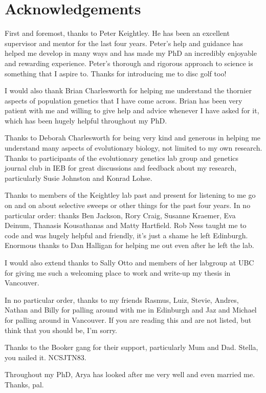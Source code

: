 \chapter{Acknowledgements}

First and foremost, thanks to Peter Keightley. He has been an excellent supervisor and mentor for the last four years. Peter's help and guidance has helped me develop in many ways and has made my PhD an incredibly enjoyable and rewarding experience. Peter's thorough and rigorous approach to science is something that I aspire to. Thanks for introducing me to disc golf too!

I would also thank Brian Charlesworth for helping me understand the thornier aspects of population genetics that I have come across. Brian has been very patient with me and willing to give help and advice whenever I have asked for it, which has been hugely helpful throughout my PhD.

Thanks to Deborah Charlesworth for being very kind and generous in helping me understand many aspects of evolutionary biology, not limited to my own research. Thanks to participants of the evolutionary genetics lab group and genetics journal club in IEB for great discussions and feedback about my research, particularly Susie Johnston and Konrad Lohse.

Thanks to members of the Keightley lab past and present for listening to me go on and on about selective sweeps or other things for the past four years. In no particular order: thanks Ben Jackson, Rory Craig, Susanne Kraemer, Eva Deinum, Thanasis Kousathanas and Matty Hartfield. Rob Ness taught me to code and was hugely helpful and friendly, it's just a shame he left Edinburgh. Enormous thanks to Dan Halligan for helping me out even after he left the lab.

I would also extend thanks to Sally Otto and members of her labgroup at UBC for giving me such a welcoming place to work and write-up my thesis in Vancouver.

In no particular order, thanks to my friends Rasmus, Luiz, Stevie, Andres, Nathan and Billy for palling around with me in Edinburgh and Jaz and Michael for palling around in Vancouver. If you are reading this and are not listed, but think that you should be, I'm sorry.

Thanks to the Booker gang for their support, particularly Mum and Dad. Stella, you nailed it. NCSJTN83.

Throughout my PhD, Arya has looked after me very well and even married me. Thanks, pal.
